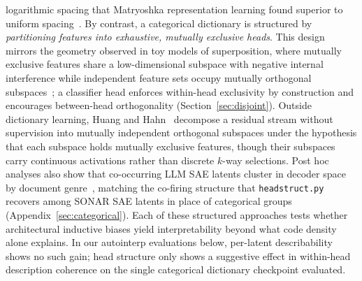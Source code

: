 logarithmic spacing that Matryoshka representation learning found
superior to uniform spacing~\cite{kusupati2022}. By contrast, a
categorical dictionary is structured by \emph{partitioning features into
exhaustive, mutually exclusive heads}. This design mirrors the geometry
observed in toy models of superposition, where mutually exclusive
features share a low-dimensional subspace with negative internal
interference while independent feature sets occupy mutually orthogonal
subspaces~\cite{elhage2022}; a classifier head enforces within-head
exclusivity by construction and encourages between-head orthogonality
(Section~\ref{sec:disjoint}). Outside dictionary learning, Huang and
Hahn~\cite{huang2025decomposing} decompose a residual stream without
supervision into mutually independent orthogonal subspaces under the
hypothesis that each subspace holds mutually exclusive features, though
their subspaces carry continuous activations rather than discrete $k$-way
selections. Post hoc analyses also show that co-occurring LLM SAE latents
cluster in decoder space by document genre~\cite{li2024geometry},
matching the co-firing structure that \texttt{headstruct.py} recovers
among SONAR SAE latents in place of categorical groups
(Appendix~\ref{sec:categorical}). Each of these structured approaches
tests whether architectural inductive biases yield interpretability
beyond what code density alone explains. In our autointerp evaluations
below, per-latent describability shows no such gain; head structure only
shows a suggestive effect in within-head description coherence on the
single categorical dictionary checkpoint evaluated.

